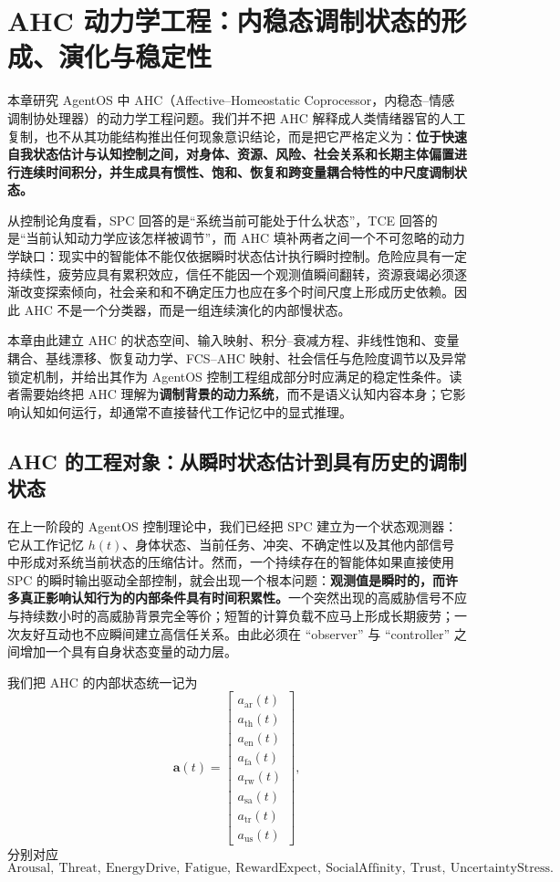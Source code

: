 \chapter{AHC 动力学工程：内稳态调制状态的形成、演化与稳定性}
\label{chap:ahc-dynamics-engineering}

\begin{chapterlead}
本章研究 AgentOS 中 AHC（Affective--Homeostatic Coprocessor，内稳态--情感调制协处理器）的动力学工程问题。我们并不把 AHC 解释成人类情绪器官的人工复制，也不从其功能结构推出任何现象意识结论，而是把它严格定义为：\textbf{位于快速自我状态估计与认知控制之间，对身体、资源、风险、社会关系和长期主体偏置进行连续时间积分，并生成具有惯性、饱和、恢复和跨变量耦合特性的中尺度调制状态。}

从控制论角度看，SPC 回答的是``系统当前可能处于什么状态''，TCE 回答的是``当前认知动力学应该怎样被调节''，而 AHC 填补两者之间一个不可忽略的动力学缺口：现实中的智能体不能仅依据瞬时状态估计执行瞬时控制。危险应具有一定持续性，疲劳应具有累积效应，信任不能因一个观测值瞬间翻转，资源衰竭必须逐渐改变探索倾向，社会亲和和不确定压力也应在多个时间尺度上形成历史依赖。因此 AHC 不是一个分类器，而是一组连续演化的内部慢状态。

本章由此建立 AHC 的状态空间、输入映射、积分--衰减方程、非线性饱和、变量耦合、基线漂移、恢复动力学、FCS--AHC 映射、社会信任与危险度调节以及异常锁定机制，并给出其作为 AgentOS 控制工程组成部分时应满足的稳定性条件。读者需要始终把 AHC 理解为\textbf{调制背景的动力系统}，而不是语义认知内容本身；它影响认知如何运行，却通常不直接替代工作记忆中的显式推理。
\end{chapterlead}


\section{AHC 的工程对象：从瞬时状态估计到具有历史的调制状态}

在上一阶段的 AgentOS 控制理论中，我们已经把 SPC 建立为一个状态观测器：它从工作记忆 $h(t)$、身体状态、当前任务、冲突、不确定性以及其他内部信号中形成对系统当前状态的压缩估计。然而，一个持续存在的智能体如果直接使用 SPC 的瞬时输出驱动全部控制，就会出现一个根本问题：\textbf{观测值是瞬时的，而许多真正影响认知行为的内部条件具有时间积累性。}一个突然出现的高威胁信号不应与持续数小时的高威胁背景完全等价；短暂的计算负载不应马上形成长期疲劳；一次友好互动也不应瞬间建立高信任关系。由此必须在 ``observer'' 与 ``controller'' 之间增加一个具有自身状态变量的动力层。

我们把 AHC 的内部状态统一记为
\[
\mathbf a(t)
=
\begin{bmatrix}
a_{\mathrm{ar}}(t)\\
a_{\mathrm{th}}(t)\\
a_{\mathrm{en}}(t)\\
a_{\mathrm{fa}}(t)\\
a_{\mathrm{rw}}(t)\\
a_{\mathrm{sa}}(t)\\
a_{\mathrm{tr}}(t)\\
a_{\mathrm{us}}(t)
\end{bmatrix},
\]
分别对应
\[
\mathrm{Arousal},\
\mathrm{Threat},\
\mathrm{EnergyDrive},\
\mathrm{Fatigue},\
\mathrm{RewardExpect},\
\mathrm{SocialAffinity},\
\mathrm{Trust},\
\mathrm{UncertaintyStress}.
\]

